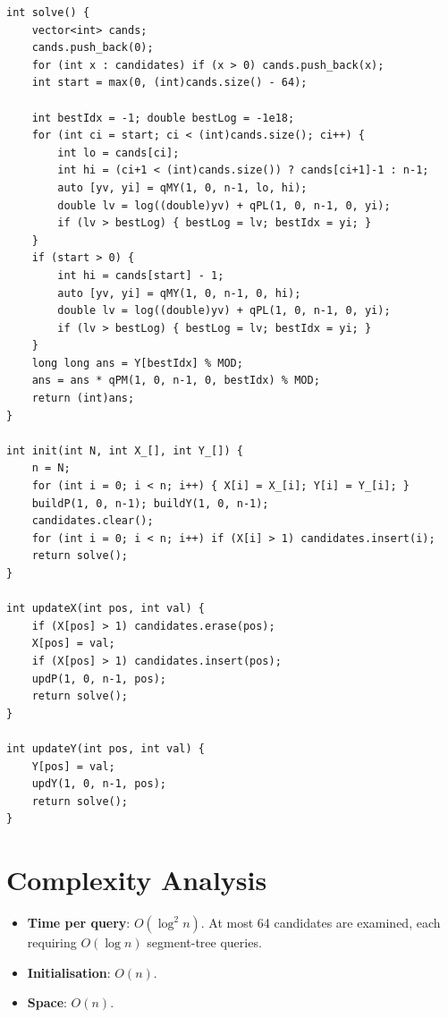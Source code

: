 \documentclass[11pt,a4paper]{article}
\begin{document}
\begin{lstlisting}
int solve() {
    vector<int> cands;
    cands.push_back(0);
    for (int x : candidates) if (x > 0) cands.push_back(x);
    int start = max(0, (int)cands.size() - 64);

    int bestIdx = -1; double bestLog = -1e18;
    for (int ci = start; ci < (int)cands.size(); ci++) {
        int lo = cands[ci];
        int hi = (ci+1 < (int)cands.size()) ? cands[ci+1]-1 : n-1;
        auto [yv, yi] = qMY(1, 0, n-1, lo, hi);
        double lv = log((double)yv) + qPL(1, 0, n-1, 0, yi);
        if (lv > bestLog) { bestLog = lv; bestIdx = yi; }
    }
    if (start > 0) {
        int hi = cands[start] - 1;
        auto [yv, yi] = qMY(1, 0, n-1, 0, hi);
        double lv = log((double)yv) + qPL(1, 0, n-1, 0, yi);
        if (lv > bestLog) { bestLog = lv; bestIdx = yi; }
    }
    long long ans = Y[bestIdx] % MOD;
    ans = ans * qPM(1, 0, n-1, 0, bestIdx) % MOD;
    return (int)ans;
}

int init(int N, int X_[], int Y_[]) {
    n = N;
    for (int i = 0; i < n; i++) { X[i] = X_[i]; Y[i] = Y_[i]; }
    buildP(1, 0, n-1); buildY(1, 0, n-1);
    candidates.clear();
    for (int i = 0; i < n; i++) if (X[i] > 1) candidates.insert(i);
    return solve();
}

int updateX(int pos, int val) {
    if (X[pos] > 1) candidates.erase(pos);
    X[pos] = val;
    if (X[pos] > 1) candidates.insert(pos);
    updP(1, 0, n-1, pos);
    return solve();
}

int updateY(int pos, int val) {
    Y[pos] = val;
    updY(1, 0, n-1, pos);
    return solve();
}
\end{lstlisting}

\section{Complexity Analysis}

\begin{itemize}
  \item \textbf{Time per query}: $O(\log^2 n)$. At most 64 candidates are examined, each requiring $O(\log n)$ segment-tree queries.
  \item \textbf{Initialisation}: $O(n)$.
  \item \textbf{Space}: $O(n)$.
\end{itemize}
\end{document}
